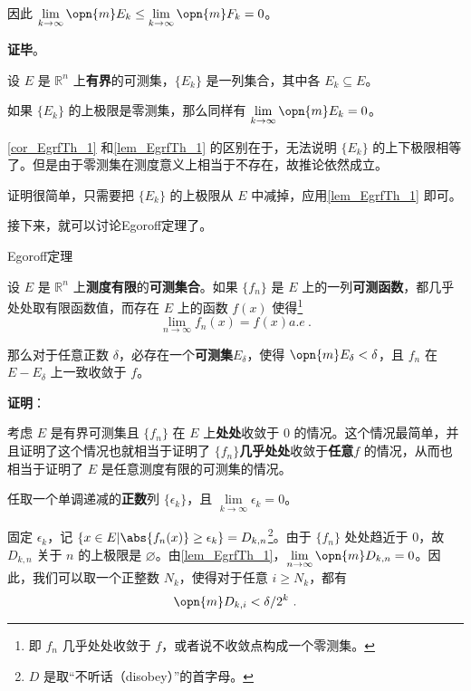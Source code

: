 因此 $\lim\limits_{k\to\infty}\opn{m}E_k\leq\lim\limits_{k\to\infty}\opn{m}F_k=0$。


\textbf{证毕}。

\begin{corollary}{}\label{cor_EgrfTh_1}
设 $E$ 是 $\mathbb{R}^n$ 上\textbf{有界}的可测集，$\{E_k\}$ 是一列集合，其中各 $E_k\subseteq E$。

如果 $\{E_k\}$ 的上极限是零测集，那么同样有 $\lim\limits_{k\to\infty}\opn{m}E_k=0$。
\end{corollary}

\autoref{cor_EgrfTh_1} 和\autoref{lem_EgrfTh_1} 的区别在于，无法说明 $\{E_k\}$ 的上下极限相等了。但是由于零测集在测度意义上相当于不存在，故推论依然成立。

证明很简单，只需要把 $\{E_k\}$ 的上极限从 $E$ 中减掉，应用\autoref{lem_EgrfTh_1} 即可。





接下来，就可以讨论Egoroff定理了。


\begin{theorem}{Egoroff定理}\label{the_EgrfTh_1}

设 $E$ 是 $\mathbb{R}^n$ 上\textbf{测度有限}的\textbf{可测集合}。如果 $\{f_n\}$ 是 $E$ 上的一列\textbf{可测函数}，都几乎处处取有限函数值，而存在 $E$ 上的函数 $f(x)$ 使得\footnote{即 $f_n$ 几乎处处收敛于 $f$，或者说不收敛点构成一个零测集。}\begin{equation}
\lim\limits_{n\to\infty}f_n(x)=f(x)a. e~. 
\end{equation}

那么对于任意正数 $\delta$，必存在一个\textbf{可测集}$E_\delta$，使得 $\opn{m}E_\delta<\delta$，且 $f_n$ 在 $E-E_\delta$ 上一致收敛于 $f$。

\end{theorem}

\textbf{证明}：

考虑 $E$ 是有界可测集且 $\{f_n\}$ 在 $E$ 上\textbf{处处}收敛于 $0$ 的情况。这个情况最简单，并且证明了这个情况也就相当于证明了 $\{f_n\}$\textbf{几乎处处}收敛于\textbf{任意}$f$ 的情况，从而也相当于证明了 $E$ 是任意测度有限的可测集的情况。



任取一个单调递减的\textbf{正数}列 $\{\epsilon_k\}$，且 $\lim\limits_{k\to\infty}\epsilon_k=0$。

固定 $\epsilon_k$，记 $\{x\in E|\abs{f_n(x)}\geq\epsilon_k\}=D_{k, n}$\footnote{$D$ 是取“不听话（disobey）”的首字母。}。由于 $\{f_n\}$ 处处趋近于 $0$，故 $D_{k, n}$ 关于 $n$ 的上极限是 $\varnothing$。由\autoref{lem_EgrfTh_1}，$\lim\limits_{n\to\infty}\opn{m}D_{k, n}=0$。因此，我们可以取一个正整数 $N_k$，使得对于任意 $i\geq N_k$，都有
\begin{equation}\label{eq_EgrfTh_2}
\opn{m}D_{k, i}<\delta/2^k~.
\end{equation}

